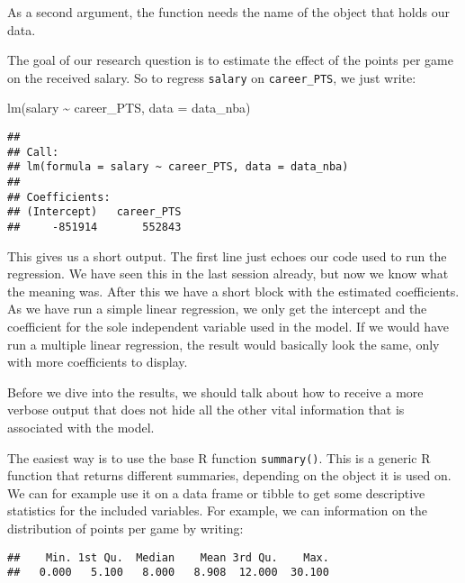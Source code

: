 \documentclass[
]{book}
\newenvironment{Shaded}{\begin{snugshade}}{\end{snugshade}}
\newcommand{\AttributeTok}[1]{\textcolor[rgb]{0.77,0.63,0.00}{#1}}
\newcommand{\AttributeTok}[1]{\textcolor[rgb]{0.13,0.29,0.53}{#1}}
\newcommand{\FunctionTok}[1]{\textcolor[rgb]{0.00,0.00,0.00}{#1}}
\newcommand{\FunctionTok}[1]{\textcolor[rgb]{0.13,0.29,0.53}{\textbf{#1}}}
\newcommand{\NormalTok}[1]{#1}
\newcommand{\SpecialCharTok}[1]{\textcolor[rgb]{0.00,0.00,0.00}{#1}}
\newcommand{\SpecialCharTok}[1]{\textcolor[rgb]{0.81,0.36,0.00}{\textbf{#1}}}
\begin{document}
As a second argument, the function needs the name of the object that holds our
data.

The goal of our research question is to estimate the effect of the points per
game on the received salary. So to regress \texttt{salary} on \texttt{career\_PTS}, we just
write:

\begin{Shaded}
\begin{Highlighting}[]
\FunctionTok{lm}\NormalTok{(salary }\SpecialCharTok{\textasciitilde{}}\NormalTok{ career\_PTS, }\AttributeTok{data =}\NormalTok{ data\_nba)}
\end{Highlighting}
\end{Shaded}

\begin{verbatim}
## 
## Call:
## lm(formula = salary ~ career_PTS, data = data_nba)
## 
## Coefficients:
## (Intercept)   career_PTS  
##     -851914       552843
\end{verbatim}

This gives us a short output. The first line just echoes our code used to run
the regression. We have seen this in the last session already, but now we know
what the meaning was. After this we have a short block with the estimated
coefficients. As we have run a simple linear regression, we only get the
intercept and the coefficient for the sole independent variable used in the
model. If we would have run a multiple linear regression, the result would
basically look the same, only with more coefficients to display.

Before we dive into the results, we should talk about how to receive a more
verbose output that does not hide all the other vital information that is
associated with the model.

The easiest way is to use the base R function \texttt{summary()}. This is a generic R
function that returns different summaries, depending on the object it is used
on. We can for example use it on a data frame or tibble to get some descriptive
statistics for the included variables. For example, we can information on the
distribution of points per game by writing:

\begin{Shaded}
\end{Shaded}

\begin{verbatim}
##    Min. 1st Qu.  Median    Mean 3rd Qu.    Max. 
##   0.000   5.100   8.000   8.908  12.000  30.100
\end{verbatim}
\end{document}
